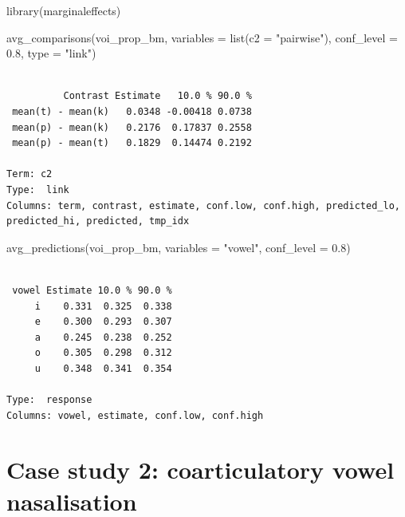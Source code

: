 \documentclass[
  authoryear,
  preprint,
  3p]{elsarticle}
\newenvironment{Shaded}{\begin{snugshade}}{\end{snugshade}}
\newcommand{\AttributeTok}[1]{\textcolor[rgb]{0.40,0.45,0.13}{#1}}
\newcommand{\FloatTok}[1]{\textcolor[rgb]{0.68,0.00,0.00}{#1}}
\newcommand{\FunctionTok}[1]{\textcolor[rgb]{0.28,0.35,0.67}{#1}}
\newcommand{\NormalTok}[1]{\textcolor[rgb]{0.00,0.23,0.31}{#1}}
\newcommand{\StringTok}[1]{\textcolor[rgb]{0.13,0.47,0.30}{#1}}
\begin{document}
\begin{Shaded}
\begin{Highlighting}[]
\FunctionTok{library}\NormalTok{(marginaleffects)}

\FunctionTok{avg\_comparisons}\NormalTok{(voi\_prop\_bm, }\AttributeTok{variables =} \FunctionTok{list}\NormalTok{(}\AttributeTok{c2 =} \StringTok{"pairwise"}\NormalTok{), }\AttributeTok{conf\_level =} \FloatTok{0.8}\NormalTok{, }\AttributeTok{type =} \StringTok{"link"}\NormalTok{)}
\end{Highlighting}
\end{Shaded}

\begin{verbatim}

          Contrast Estimate   10.0 % 90.0 %
 mean(t) - mean(k)   0.0348 -0.00418 0.0738
 mean(p) - mean(k)   0.2176  0.17837 0.2558
 mean(p) - mean(t)   0.1829  0.14474 0.2192

Term: c2
Type:  link 
Columns: term, contrast, estimate, conf.low, conf.high, predicted_lo, predicted_hi, predicted, tmp_idx 
\end{verbatim}

\begin{Shaded}
\begin{Highlighting}[]
\FunctionTok{avg\_predictions}\NormalTok{(voi\_prop\_bm, }\AttributeTok{variables =} \StringTok{"vowel"}\NormalTok{, }\AttributeTok{conf\_level =} \FloatTok{0.8}\NormalTok{)}
\end{Highlighting}
\end{Shaded}

\begin{verbatim}

 vowel Estimate 10.0 % 90.0 %
     i    0.331  0.325  0.338
     e    0.300  0.293  0.307
     a    0.245  0.238  0.252
     o    0.305  0.298  0.312
     u    0.348  0.341  0.354

Type:  response 
Columns: vowel, estimate, conf.low, conf.high 
\end{verbatim}

\section{Case study 2: coarticulatory vowel
nasalisation}\label{case-study-2-coarticulatory-vowel-nasalisation}
\end{document}
